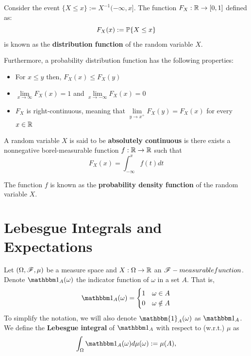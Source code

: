 \documentclass[../TGMAFFIRO.tex]{subfiles}
\begin{document}
\begin{definition}\label{dist_func}
	Consider the event $\{X \leq x\} := X^{-1}(-\infty, x]$. The function $F_X: \mathbb{R} \rightarrow [0, 1]$ defined as:
	\begin{equation}
		F_X(x) := \mathbb{P}\{X \leq x\}
	\end{equation}
	is known as the \textbf{distribution function} of the random variable $X$.
\end{definition}

Furthermore, a probability distribution function has the following properties:
\begin{itemize}
	\item For $x \leq y$ then, $F_X(x) \leq F_X(y)$
	\item $\lim\limits_{x\to\infty} F_X(x) = 1$ and $\lim\limits_{x\to - \infty} F_X(x) = 0$
	\item $F_X$ is right-continuous, meaning that $\lim\limits_{y\to x^+} F_X(y) = F_X(x)$ for every $x \in \mathbb{R}$
\end{itemize}

\begin{definition}
	A random variable $X$ is said to be \textbf{absolutely continuous} is there exists a nonnegative borel-measurable function $f: \mathbb{R}\rightarrow\mathbb{R}$ such that 
	\begin{equation}
		F_X(x) = \int_{-\infty}^{x} f(t) dt
	\end{equation}
\end{definition}

The function $f$ is known as the \textbf{probability density function} of the random variable $X$.

\section{Lebesgue Integrals and Expectations}
\begin{definition}
	Let $(\Omega, \mathscr{F}, \mu)$ be a measure space and $X: \Omega \to \mathbb{R}$ an $\mathscr{F}-measurable function$. Denote $\ind_A(\omega)$ the indicator function of $\omega$ in a set $A$. That is,
	\[
	\ind_A(\omega) = 
		\begin{cases}
			1 & \omega \in A \\
			0 & \omega \notin A
		\end{cases}
	\]
	To simplify the notation, we will also denote $\mathbbm{1}_A(\omega)$ as $\ind_A$.
	We define the \textbf{Lebesgue integral} of $\ind_A$ with respect to (w.r.t.) $\mu$ as
	\begin{equation}
		\int_\Omega \ind_A(\omega) d\mu(\omega) := \mu(A),
	\end{equation}
	
\end{definition}
\end{document}
